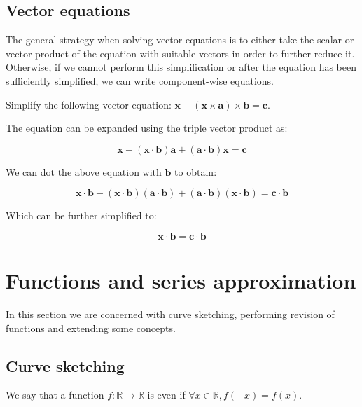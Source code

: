 \documentclass[12pt]{article}
\begin{document}
\newpage

\subsection{Vector equations}

The general strategy when solving vector equations is to either take the scalar or vector product of the equation with suitable vectors in order to further reduce it. Otherwise, if we cannot perform this simplification or after the equation has been sufficiently simplified, we can write component-wise equations.

\begin{example}
    Simplify the following vector equation: $\mathbf{x} - (\mathbf{x \times a}) \times \mathbf{b} = \mathbf{c}$. 

    The equation can be expanded using the triple vector product as:

    \[ \mathbf{x} - (\mathbf{x \cdot b})\mathbf{a} + (\mathbf{a} \cdot \mathbf{b})\mathbf{x} = \mathbf{c} \]

    We can dot the above equation with $\mathbf{b}$ to obtain:

    \[ \mathbf{x \cdot b} - (\mathbf{x} \cdot \mathbf{b})(\mathbf{a} \cdot \mathbf{b}) + (\mathbf{a} \cdot \mathbf{b})(\mathbf{x} \cdot \mathbf{b}) = \mathbf{c \cdot b} \]

    Which can be further simplified to:

    \[ \mathbf{x \cdot b} = \mathbf{c \cdot b} \]
\end{example}

\newpage

\section{Functions and series approximation}

In this section we are concerned with curve sketching, performing revision of functions and extending some concepts.

\subsection{Curve sketching}

\begin{definition}
    We say that a function $f : \mathbb{R} \to \mathbb{R}$ is even if $\forall x \in \mathbb{R}, f(-x) = f(x)$.
\end{definition}
\end{document}
